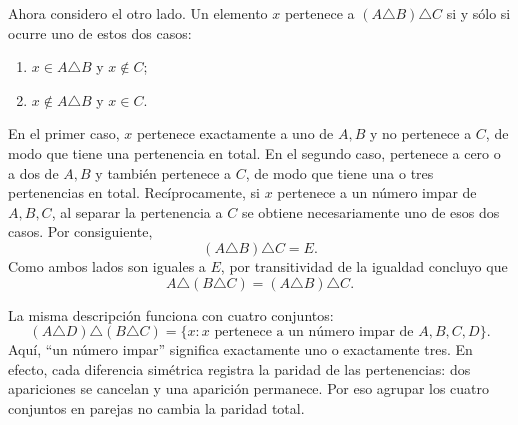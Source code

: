 \documentclass[11pt]{article}
\begin{document}
\begin{solution}
Ahora considero el otro lado. Un elemento $x$ pertenece a
$(A\triangle B)\triangle C$ si y sólo si ocurre uno de estos dos casos:
\begin{enumerate}
  \item $x\in A\triangle B$ y $x\notin C$;
  \item $x\notin A\triangle B$ y $x\in C$.
\end{enumerate}
En el primer caso, $x$ pertenece exactamente a uno de $A,B$ y no pertenece a
$C$, de modo que tiene una pertenencia en total. En el segundo caso, pertenece
a cero o a dos de $A,B$ y también pertenece a $C$, de modo que tiene una o tres
pertenencias en total. Recíprocamente, si $x$ pertenece a un número impar de
$A,B,C$, al separar la pertenencia a $C$ se obtiene necesariamente uno de esos
dos casos. Por consiguiente,
\[
(A\triangle B)\triangle C=E.
\]
Como ambos lados son iguales a $E$, por transitividad de la igualdad concluyo
que
\[
A\triangle(B\triangle C)=(A\triangle B)\triangle C.
\]

La misma descripción funciona con cuatro conjuntos:
\[
\boxed{(A\triangle D)\triangle(B\triangle C)
=\{x:x\text{ pertenece a un número impar de }A,B,C,D\}}.
\]
Aquí, ``un número impar'' significa exactamente uno o exactamente tres.
En efecto, cada diferencia simétrica registra la paridad de las pertenencias:
dos apariciones se cancelan y una aparición permanece. Por eso agrupar los
cuatro conjuntos en parejas no cambia la paridad total.
\end{solution}
\end{document}
